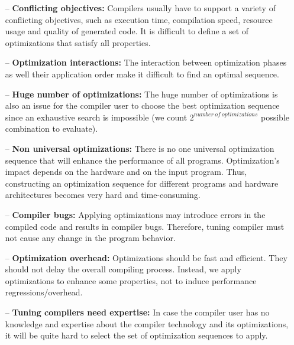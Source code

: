 \begin{itemize}
	\item[--] \textbf{Conflicting objectives:} Compilers usually have to support a variety of conflicting objectives, such as execution time, compilation speed, resource usage and quality of generated code. It is difficult to define a set of optimizations that satisfy all properties.
	
	\item[--] \textbf{Optimization interactions:} The interaction between optimization phases as well their application order make it difficult to find an optimal sequence.
	
	\item[--] \textbf{Huge number of optimizations:} The huge number of optimizations is also an issue for the compiler user to choose the best optimization sequence since an exhaustive search is impossible (we count $2^{number\ of\ optimizations}$ possible combination to evaluate).
	
	\item[--] \textbf{Non universal optimizations:} There is no one universal optimization sequence that will enhance the performance of all programs. Optimization's impact depends on the hardware and on the input program. Thus, constructing an optimization sequence for different programs and hardware architectures becomes very hard and time-consuming.
	
	\item[--] \textbf{Compiler bugs:} Applying optimizations may introduce errors in the compiled code and results in compiler bugs\cite{le2014compiler,yang2011finding}. Therefore, tuning compiler must not cause any change in the program behavior.
	
	\item[--] \textbf{Optimization overhead:} Optimizations should be fast and efficient. They should not delay the overall compiling process. Instead, we apply optimizations to enhance some properties, not to induce performance regressions/overhead.
	
	\item[--] \textbf{Tuning compilers need expertise:} In case the compiler user has no knowledge and expertise about the compiler technology and its optimizations, it will be quite hard to select the set of optimization sequences to apply.
\end{itemize}

 



